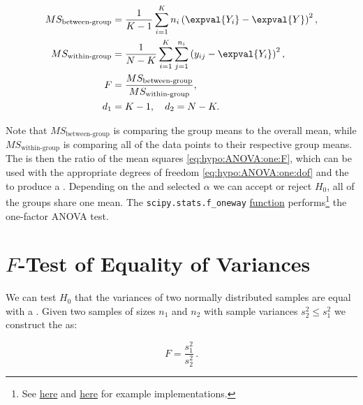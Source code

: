 \begin{subequations}\label{eq:hypo:ANOVA:one}
\begin{align}
MS_{\text{between-group}} &= \frac{1}{K-1} \sum_{i=1}^{K} n_{i}\left(\expval{Y_{i}} - \expval{Y}\right)^{2}, \label{eq:hypo:ANOVA:one:MS_between} \\
MS_{\text{within-group}} &= \frac{1}{N-K} \sum_{i=1}^{K} \sum_{j=1}^{n_{i}} \left( y_{ij} - \expval{Y_{i}} \right)^{2}, \label{eq:hypo:ANOVA:one:MS_within} \\
F &= \frac{MS_{\text{between-group}}}{MS_{\text{within-group}}}, \label{eq:hypo:ANOVA:one:F} \\
d_{1} &= K-1,\quad d_{2} = N-K. \label{eq:hypo:ANOVA:one:dof}
\end{align}
\end{subequations}

Note that $MS_{\text{between-group}}$ is comparing the group means to the overall mean,
while $MS_{\text{within-group}}$ is comparing all of the data points to their respective group means.
The \Fstat is then the ratio of the mean squares \cref{eq:hypo:ANOVA:one:F},
which can be used with the appropriate degrees of freedom \cref{eq:hypo:ANOVA:one:dof}
and the \Fdist to produce a \pvalue.
Depending on the \pvalue and selected $\alpha$
we can accept or reject $H_{0}$,
\ie all of the groups share one mean.
The \texttt{scipy.stats.f\_oneway} \href{https://docs.scipy.org/doc/scipy/reference/generated/scipy.stats.f_oneway.html#scipy.stats.f_oneway}{function}
performs\footnote{See
\href{https://www.analyticsvidhya.com/blog/2020/06/introduction-anova-statistics-data-science-covid-python/}{here} and
\href{https://www.reneshbedre.com/blog/anova.html}{here}
for example implementations.} the one-factor ANOVA test.

\section{\texorpdfstring{$F$}{F}-Test of Equality of Variances}
\label{hypo:F_test_var}

We can test $H_{0}$ that the variances of two normally distributed samples are equal with a \Ftest.
Given two samples of sizes $n_{1}$ and $n_{2}$ with sample variances $s_{2}^{2} \leq s_{1}^{2}$
we construct the \Fstat as:

\begin{equation}\label{eq:hypo:F_test_var}
F = \frac{s_{1}^{2}}{s_{2}^{2}}\,.
\end{equation}

